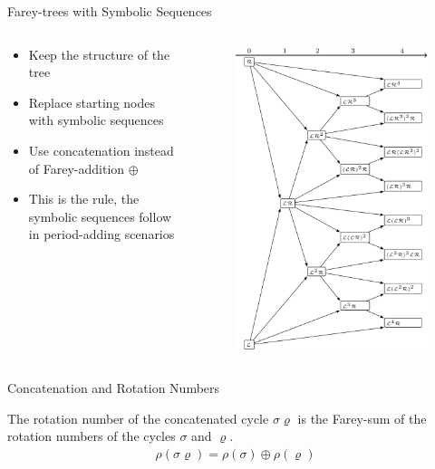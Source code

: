 \begin{frame}{Farey-trees with Symbolic Sequences}
	\begin{columns}
		\begin{column}{.5 \textwidth}
			\begin{itemize}
				\item Keep the structure of the tree
				\item Replace starting nodes with symbolic sequences
				\item Use concatenation instead of Farey-addition $\oplus$
				\item This is the rule, the symbolic sequences follow in period-adding scenarios
			\end{itemize}
		\end{column}
		\begin{column}{.5 \textwidth}
			\vspace{-3em}
			\begin{figure}
				\includegraphics[width=.6 \textwidth]{../../Report/Figures/FareyTrees/LR/adding.png}
			\end{figure}
		\end{column}
	\end{columns}
\end{frame}

\begin{frame}{Concatenation and Rotation Numbers}
	\begin{theorem}
		The rotation number of the concatenated cycle $\sigma\varrho$ is the Farey-sum of the rotation numbers of the cycles $\sigma$ and $\varrho$.
		\begin{align*}
			\rho(\sigma\varrho) = \rho(\sigma) \oplus \rho(\varrho)
		\end{align*}
	\end{theorem}
\end{frame}

